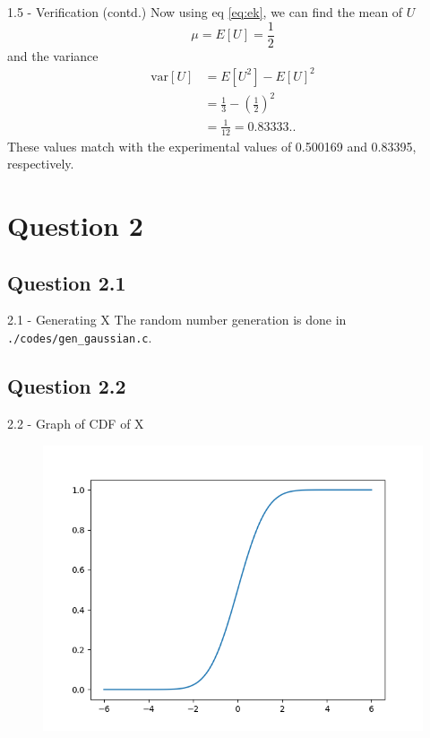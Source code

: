 \documentclass{beamer}
\begin{document}
\begin{frame}{1.5 - Verification (contd.)}
    Now using eq \eqref{eq:ek}, we can find the mean of $U$
    \begin{equation}
        \mu = E\left[U\right] = \frac{1}{2}
    \end{equation}
    and the variance
    \begin{align}
        \text{var}\left[U\right] &= E\left[U^2\right] - E\left[U\right]^2 \\
        &= \frac{1}{3} - \left(\frac{1}{2}\right)^2 \\
        &= \frac{1}{12} = 0.83333..
    \end{align}
    These values match with the experimental values of 0.500169 and 0.83395, respectively.
\end{frame}

\section{Question 2}
\subsection{Question 2.1}
\begin{frame}{2.1 - Generating X}
    The random number generation is done in \texttt{./codes/gen\_gaussian.c}.
\end{frame}

\subsection{Question 2.2}
\begin{frame}{2.2 - Graph of CDF of X}
    \begin{figure}[!ht]
        \includegraphics[width=\textheight]{figs/cdf_gau.png}
    \end{figure}
\end{frame}
\end{document}
